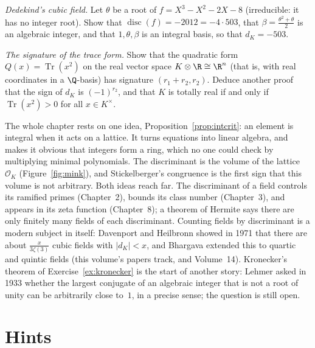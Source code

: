 \begin{exercise}[$\star\star\star$]\label{ex:dedekind}
\emph{Dedekind's cubic field.} Let $\theta$ be a root of $f=X^3-X^2-2X-8$ (irreducible: it has no integer root). Show
that $\operatorname{disc}(f)=-2012=-4\cdot503$, that $\beta=\frac{\theta^2+\theta}2$ is an algebraic integer, and that
$1,\theta,\beta$ is an integral basis, so that $d_K=-503$.
\end{exercise}

\begin{exercise}[$\star\star\star$]\label{ex:traceform}
\emph{The signature of the trace form.} Show that the quadratic form $Q(x)=\operatorname{Tr}(x^2)$ on the real vector
space $K\otimes\R\cong\R^n$ (that is, with real coordinates in a $\Q$-basis) has signature $(r_1+r_2,r_2)$. Deduce
another proof that the sign of $d_K$ is $(-1)^{r_2}$, and that $K$ is totally real if and only if $\operatorname{Tr}(x^2)>0$
for all $x\in K^\times$.
\end{exercise}

\begin{beauty}
The whole chapter rests on one idea, Proposition~\ref{prop:intcrit}: an element is integral when it acts on a lattice.
It turns equations into linear algebra, and makes it obvious that integers form a ring, which no one could check by
multiplying minimal polynomials. The discriminant is the volume of the lattice $\mathcal O_K$ (Figure~\ref{fig:mink}),
and Stickelberger's congruence is the first sign that this volume is not arbitrary. Both ideas reach far. The
discriminant of a field controls its ramified primes (Chapter~2), bounds its class number (Chapter~3), and appears in
its zeta function (Chapter~8); a theorem of Hermite says there are only finitely many fields of each discriminant.
Counting fields by discriminant is a modern subject in itself: Davenport and Heilbronn showed in 1971 that there are
about $\frac{x}{3\zeta(3)}$ cubic fields with $|d_K|<x$, and Bhargava extended this to quartic and quintic fields
(this volume's papers track, and Volume~14). Kronecker's theorem of Exercise~\ref{ex:kronecker} is the start of another story:
Lehmer asked in 1933 whether the largest conjugate of an algebraic integer that is not a root of unity can be
arbitrarily close to~$1$, in a precise sense; the question is still open.
\end{beauty}

\section{Hints}

